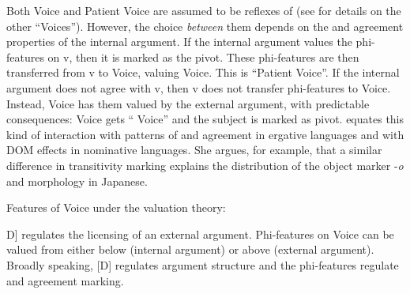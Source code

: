 \begin{exe}
\begin{xlist}
\begin{xlist}
\begin{xlist}
\begin{xlist}
\begin{xlist}
\begin{xlist}
\begin{exe}
\begin{xlist}
\begin{exe}
\begin{exe}
\begin{xlist}
\begin{exe}
\begin{exe}
\begin{xlist}
\begin{exe}
\begin{xlist}
\begin{exe}
\begin{xlist}
\begin{exe}
\begin{xlist}
\begin{exe}
\begin{xlist}
\begin{exe}
\begin{xlist}
\begin{exe}
\begin{xlist}
\begin{exe}
\begin{xlist}
\begin{exe}
\begin{xlist}
\begin{exe}
\begin{xlist}
Both  Voice and Patient Voice are assumed to be reflexes of {\vd} (see \citealt{nie17} for details on the other ``Voices''). However, the choice \emph{between} them depends on the  and agreement properties of the internal argument. If the internal argument values the phi-features on v, then it is marked as the pivot. These phi-features are then transferred from v to Voice, valuing Voice. This is ``Patient Voice''. If the internal argument does not agree with v, then v does not transfer phi-features to Voice. Instead, Voice has them valued by the external argument, with predictable consequences: Voice gets `` Voice'' and the subject is marked as pivot. \cite{nie17} equates this kind of interaction with patterns of  and agreement in ergative languages and with DOM effects in nominative languages. She argues, for example, that a similar difference in transitivity marking explains the distribution of the object marker -\emph{o} and  morphology in Japanese.
 \begin{exe}
 \ex  Features of Voice under the valuation theory: 
 \begin{xlist} 
 	\ex  {[}D] regulates the licensing of an external argument. 
 	\ex  Phi-features on Voice can be valued from either below (internal argument) or above (external argument). 
 \z
\z 
Broadly speaking, [D] regulates argument structure and the phi-features regulate  and agreement marking.


\end{xlist}
\end{exe}
\end{xlist}
\end{exe}
\end{xlist}
\end{exe}
\end{xlist}
\end{exe}
\end{xlist}
\end{exe}
\end{xlist}
\end{exe}
\end{xlist}
\end{exe}
\end{xlist}
\end{exe}
\end{xlist}
\end{exe}
\end{xlist}
\end{exe}
\end{xlist}
\end{exe}
\end{exe}
\end{xlist}
\end{exe}
\end{exe}
\end{xlist}
\end{exe}
\end{xlist}
\end{xlist}
\end{xlist}
\end{xlist}
\end{xlist}
\end{xlist}
\end{exe}
